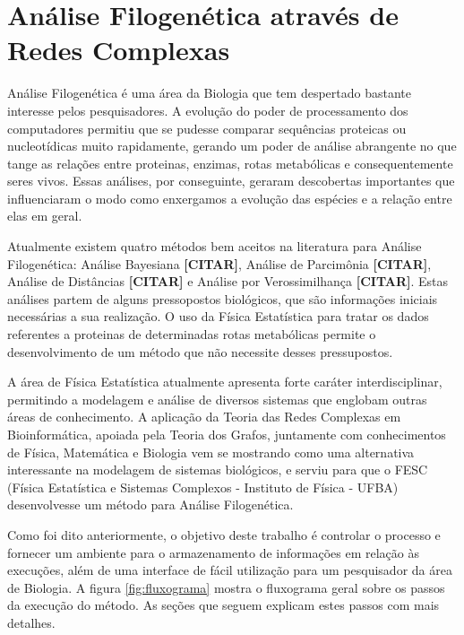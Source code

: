 \chapter{Análise Filogenética através de Redes Complexas} \label{cap:analisefilo}

Análise Filogenética é uma área da Biologia que tem despertado bastante interesse pelos pesquisadores. A evolução do poder de processamento dos computadores
permitiu que se pudesse comparar sequências proteicas ou nucleotídicas muito rapidamente, gerando um poder de análise abrangente no que tange as relações entre
proteinas, enzimas, rotas metabólicas e consequentemente seres vivos. Essas análises, por conseguinte, geraram descobertas importantes que influenciaram o
modo como enxergamos a evolução das espécies e a relação entre elas em geral.

Atualmente existem quatro métodos bem aceitos na literatura para Análise Filogenética: Análise Bayesiana \textbf{[CITAR]}, Análise de Parcimônia
\textbf{[CITAR]}, Análise de Distâncias \textbf{[CITAR]} e Análise por Verossimilhança \textbf{[CITAR]}. Estas análises partem de alguns pressopostos
biológicos, que são informações iniciais necessárias a sua realização. O uso da Física Estatística para tratar os dados referentes a proteinas de
determinadas rotas metabólicas permite o desenvolvimento de um método que não necessite desses pressupostos.

A área de Física Estatística atualmente apresenta forte caráter interdisciplinar, permitindo a modelagem e análise de diversos sistemas
que englobam outras áreas de conhecimento. A aplicação da Teoria das Redes Complexas em Bioinformática, apoiada pela Teoria dos Grafos,
juntamente com conhecimentos de Física, Matemática e Biologia vem se mostrando como uma alternativa interessante na modelagem de sistemas biológicos,
e serviu para que o FESC (Física Estatística e Sistemas Complexos - Instituto de Física - UFBA) desenvolvesse um método para Análise Filogenética.


Como foi dito anteriormente, o objetivo deste trabalho é controlar o processo e fornecer um ambiente para o armazenamento de informações em relação às
execuções, além de uma interface de fácil utilização para um pesquisador da área de Biologia. A figura \ref{fig:fluxograma} mostra o fluxograma geral
sobre os passos da execução do método. As seções que seguem explicam estes passos com mais detalhes.

